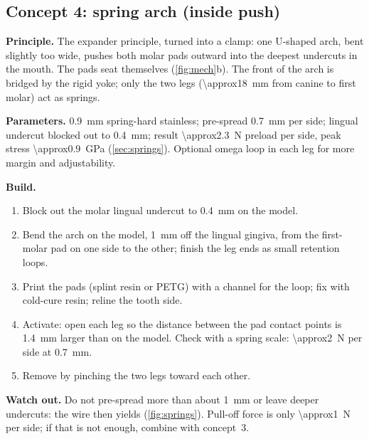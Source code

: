 \subsection{Concept 4: spring arch (inside push)}
\textbf{Principle.} The expander principle, turned into a clamp: one U-shaped arch, bent slightly
too wide, pushes both molar pads outward into the deepest undercuts in the mouth. The pads seat
themselves (\cref{fig:mech}b). The front of the arch is bridged by the rigid yoke; only the two
legs (\SI{\approx18}{mm} from canine to first molar) act as springs.

\textbf{Parameters.} \SI{0.9}{mm} spring-hard stainless; pre-spread \SI{0.7}{mm} per side; lingual
undercut blocked out to \SI{0.4}{mm}; result \SI{\approx2.3}{N} preload per side, peak stress
\SI{\approx0.9}{GPa} (\cref{sec:springs}). Optional omega loop in each leg for more margin and
adjustability.

\textbf{Build.}
\begin{enumerate}
\item Block out the molar lingual undercut to \SI{0.4}{mm} on the model.
\item Bend the arch on the model, \SI{1}{mm} off the lingual gingiva, from the first-molar pad on
one side to the other; finish the leg ends as small retention loops.
\item Print the pads (splint resin or PETG) with a channel for the loop; fix with cold-cure resin;
reline the tooth side.
\item Activate: open each leg so the distance between the pad contact points is
\SI{1.4}{mm} larger than on the model. Check with a spring scale: \SI{\approx2}{N} per side at
\SI{0.7}{mm}.
\item Remove by pinching the two legs toward each other.
\end{enumerate}
\textbf{Watch out.} Do not pre-spread more than about \SI{1}{mm} or leave deeper undercuts: the
wire then yields (\cref{fig:springs}). Pull-off force is only \SI{\approx1}{N} per side; if that is
not enough, combine with concept~3.

